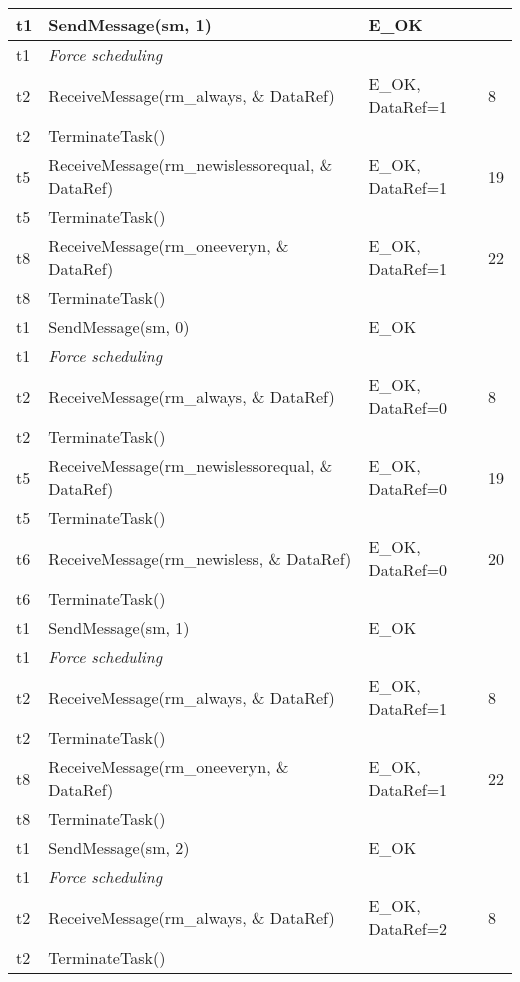 \documentclass[10pt]{article}
\newlength{\Li}\settowidth{\Li}{Running}
\newlength{\Lii}\setlength{\Lii}{7cm}
\newlength{\Liiii}\setlength{\Liiii}{0.9cm}
\newlength{\Liii}\setlength{\Liii}{\textwidth} \addtolength{\Liii}{-\Li} \addtolength{\Liii}{-\Lii} \addtolength{\Liii}{-\Liiii}
\begin{document}
\begin{supertabular}{|p{\Li}|p{\Lii}|p{\Liii}|p{\Liiii}|}
	t1	& SendMessage(sm, 1)										& E\_OK				& \\ \hline
	t1	& \textit{Force scheduling}									& 					& \\ \hline
	t2	& ReceiveMessage(rm\_always, \& DataRef)						& E\_OK, DataRef=1		& 8 \\ \hline
	t2	& TerminateTask()											& 					&\\ \hline	
	t5	& ReceiveMessage(rm\_newislessorequal, \& DataRef)				& E\_OK, DataRef=1		& 19 \\ \hline
	t5	& TerminateTask()											& 					&\\ \hline
	t8	& ReceiveMessage(rm\_oneeveryn, \& DataRef)					& E\_OK, DataRef=1		& 22 \\ \hline
	t8	& TerminateTask()											& 					&\\ \hline

	t1	& SendMessage(sm, 0)										& E\_OK				& \\ \hline
	t1	& \textit{Force scheduling}									& 					& \\ \hline
	t2	& ReceiveMessage(rm\_always, \& DataRef)						& E\_OK, DataRef=0		& 8 \\ \hline
	t2	& TerminateTask()											& 					&\\ \hline	
	t5	& ReceiveMessage(rm\_newislessorequal, \& DataRef)				& E\_OK, DataRef=0		& 19 \\ \hline
	t5	& TerminateTask()											& 					&\\ \hline
	t6	& ReceiveMessage(rm\_newisless, \& DataRef)					& E\_OK, DataRef=0		& 20 \\ \hline
	t6	& TerminateTask()											& 					&\\ \hline

	t1	& SendMessage(sm, 1)										& E\_OK				& \\ \hline
	t1	& \textit{Force scheduling}									& 					& \\ \hline
	t2	& ReceiveMessage(rm\_always, \& DataRef)						& E\_OK, DataRef=1		& 8 \\ \hline
	t2	& TerminateTask()											& 					&\\ \hline	
	t8	& ReceiveMessage(rm\_oneeveryn, \& DataRef)					& E\_OK, DataRef=1		& 22 \\ \hline
	t8	& TerminateTask()											& 					&\\ \hline

	t1	& SendMessage(sm, 2)										& E\_OK				& \\ \hline
	t1	& \textit{Force scheduling}									& 					& \\ \hline
	t2	& ReceiveMessage(rm\_always, \& DataRef)						& E\_OK, DataRef=2		& 8 \\ \hline
	t2	& TerminateTask()											& 					&\\ \hline	


\end{supertabular}
\end{document}
